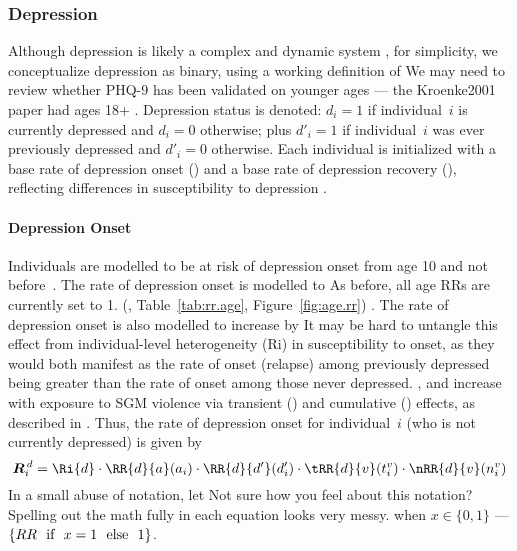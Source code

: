 \subsubsection{Depression}\label{mod.par.evt.dep}
Although depression is likely a complex and dynamic system \cite{Cramer2016},
for simplicity, we conceptualize depression as binary,
using a working definition of
     {We may need to review whether PHQ-9 has been validated on younger ages
      --- the Kroenke2001 paper had ages 18+}
\cite{Kroenke2001}.
Depression status is denoted:
$d_i = 1$ if individual~$i$ is currently depressed and $d_i = 0$ otherwise; plus
$d'_i = 1$ if individual~$i$ was ever previously depressed and $d'_i = 0$ otherwise.
Each individual is initialized with
a base rate of depression onset () and
a base rate of depression recovery (\Ri{\d}),
reflecting differences in susceptibility to depression \cite{Hankin2015}.
\paragraph{Depression Onset}
Individuals are modelled to be at risk of depression onset
from age 10 and not before~\cite{Solmi2022}.
The rate of depression onset is modelled to
     {As before, all age RRs are currently set to 1.}
(, Table~\ref{tab:rr.age}, Figure~\ref{fig:age.rr})
\cite{Patten2010,Hankin2015,Solmi2022}.
The rate of depression onset is also modelled to increase
by 
     {It may be hard to untangle this effect from
      individual-level heterogeneity (Ri) in susceptibility to onset,
      as they would both manifest as
      the rate of onset (relapse) among previously depressed being greater than
      the rate of onset among those never depressed.}
\cite{Kendler2010},
and increase with exposure to SGM violence
via transient () and cumulative () effects,
as described in .
Thus, the rate of depression onset for individual~$i$
(who is not currently depressed) is given by
\begin{equation}
  \Gi{d} = \Ri{d}
     \cdot \RR{d}{a}(a_i)
     \cdot \RR{d}{d'}(d'_i)
     \cdot \tRR{d}{v}(t^v_i)
     \cdot \nRR{d}{v}(n^v_i)
\end{equation}
In a small abuse of notation, let
     {Not sure how you feel about this notation?
      Spelling out the math fully in each equation looks very messy.}
when $x \in \{0,1\}$
--- \ie $\{RR\text{~~if~~}x=1\text{~~else~~}1\}$.

